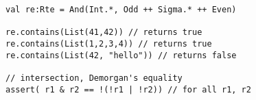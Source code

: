 \begin{lstlisting}[style=scalaioScala]
val re:Rte = And(Int.*, Odd ++ Sigma.* ++ Even)
      
re.contains(List(41,42)) // returns true
re.contains(List(1,2,3,4)) // returns true
re.contains(List(42, "hello")) // returns false

// intersection, Demorgan's equality
assert( r1 & r2 == !(!r1 | !r2)) // for all r1, r2
\end{lstlisting}
